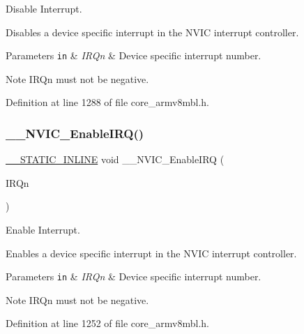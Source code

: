 Disable Interrupt. 

Disables a device specific interrupt in the N\+V\+IC interrupt controller. 
\begin{DoxyParams}[1]{Parameters}
\mbox{\tt in}  & {\em I\+R\+Qn} & Device specific interrupt number. \\
\hline
\end{DoxyParams}
\begin{DoxyNote}{Note}
I\+R\+Qn must not be negative. 
\end{DoxyNote}


Definition at line 1288 of file core\+\_\+armv8mbl.\+h.

\mbox{\label{group___c_m_s_i_s___core___n_v_i_c_functions_ga71227e1376cde11eda03fcb62f1b33ea}} 
\subsubsection{\texorpdfstring{\+\_\+\+\_\+\+N\+V\+I\+C\+\_\+\+Enable\+I\+R\+Q()}{\_\_NVIC\_EnableIRQ()}}
{\footnotesize\ttfamily \hyperlink{cmsis__iccarm_8h_aba87361bfad2ae52cfe2f40c1a1dbf9c}{\+\_\+\+\_\+\+S\+T\+A\+T\+I\+C\+\_\+\+I\+N\+L\+I\+NE} void \+\_\+\+\_\+\+N\+V\+I\+C\+\_\+\+Enable\+I\+RQ (\begin{DoxyParamCaption}\item[{\hyperlink{group___c_m_s_i_s__18_x_x___i_r_q_gaa44deabd252bda567898bae35a086adc}{I\+R\+Qn\+\_\+\+Type}}]{I\+R\+Qn }\end{DoxyParamCaption})}



Enable Interrupt. 

Enables a device specific interrupt in the N\+V\+IC interrupt controller. 
\begin{DoxyParams}[1]{Parameters}
\mbox{\tt in}  & {\em I\+R\+Qn} & Device specific interrupt number. \\
\hline
\end{DoxyParams}
\begin{DoxyNote}{Note}
I\+R\+Qn must not be negative. 
\end{DoxyNote}


Definition at line 1252 of file core\+\_\+armv8mbl.\+h.

